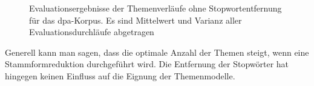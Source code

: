 \begin{figure}
\caption{Evaluationsergebnisse der Themenverläufe ohne Stopwortentfernung für das dpa-Korpus. Es sind Mittelwert und Varianz aller Evaluationsdurchläufe abgetragen}
\label{fig:dpaTopicModelEvaluationNoStop}
\end{figure}

Generell kann man sagen, dass die optimale Anzahl der Themen steigt, wenn eine Stammformreduktion durchgeführt wird. Die Entfernung der Stopwörter hat hingegen keinen Einfluss auf die Eignung der Themenmodelle. 

